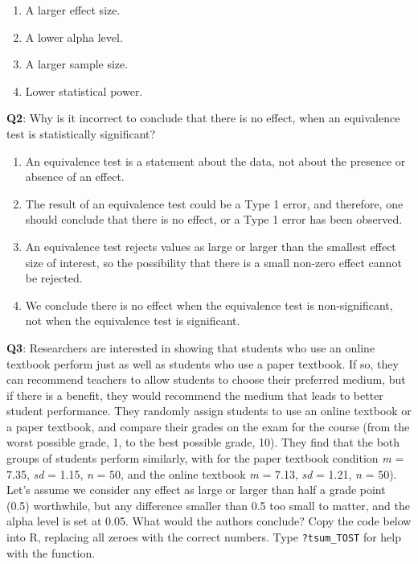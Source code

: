 \documentclass[
  oneside]{krantz}
\providecommand{\tightlist}{%
  \setlength{\itemsep}{0pt}\setlength{\parskip}{0pt}}
\begin{document}
\begin{enumerate}
\def\labelenumi{\Alph{enumi})}
\tightlist
\item
  A larger effect size.
\item
  A lower alpha level.
\item
  A larger sample size.
\item
  Lower statistical power.
\end{enumerate}

\textbf{Q2}: Why is it incorrect to conclude that there is no effect, when an equivalence test is statistically significant?

\begin{enumerate}
\def\labelenumi{\Alph{enumi})}
\tightlist
\item
  An equivalence test is a statement about the data, not about the presence or absence of an effect.
\item
  The result of an equivalence test could be a Type 1 error, and therefore, one should conclude that there is no effect, or a Type 1 error has been observed.\\
\item
  An equivalence test rejects values as large or larger than the smallest effect size of interest, so the possibility that there is a small non-zero effect cannot be rejected.\\
\item
  We conclude there is no effect when the equivalence test is non-significant, not when the equivalence test is significant.
\end{enumerate}

\textbf{Q3}: Researchers are interested in showing that students who use an online textbook perform just as well as students who use a paper textbook. If so, they can recommend teachers to allow students to choose their preferred medium, but if there is a benefit, they would recommend the medium that leads to better student performance. They randomly assign students to use an online textbook or a paper textbook, and compare their grades on the exam for the course (from the worst possible grade, 1, to the best possible grade, 10). They find that the both groups of students perform similarly, with for the paper textbook condition \emph{m} = 7.35, \emph{sd} = 1.15, \emph{n} = 50, and the online textbook \emph{m} = 7.13, \emph{sd} = 1.21, \emph{n} = 50). Let's assume we consider any effect as large or larger than half a grade point (0.5) worthwhile, but any difference smaller than 0.5 too small to matter, and the alpha level is set at 0.05. What would the authors conclude? Copy the code below into R, replacing all zeroes with the correct numbers. Type \texttt{?tsum\_TOST} for help with the function.
\end{document}
